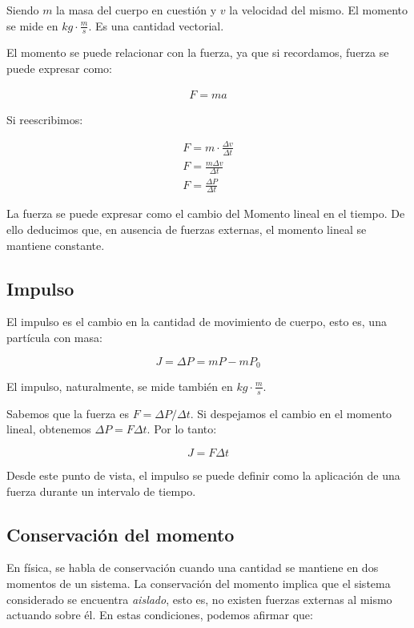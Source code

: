 \documentclass[12pt]{article}
\begin{document}
Siendo \(m\) la masa del cuerpo en cuestión y \(v\) la velocidad del mismo.
El momento se mide en \(kg\cdot\frac{m}{s}\). Es una cantidad vectorial.

El momento se puede relacionar con la fuerza, ya que si recordamos,
fuerza se puede expresar como:

\begin{align*}
	F = ma
\end{align*}

Si reescribimos:

\begin{align*}
	F = m\cdot\frac{\Delta v}{\Delta t} \\
	F = \frac{m \Delta v}{\Delta t}     \\
	F = \frac{\Delta P}{\Delta t}
\end{align*}

La fuerza se puede expresar como el cambio del Momento lineal en el
tiempo.
De ello deducimos que, en ausencia de fuerzas externas,
el momento lineal se mantiene constante.

\subsection{Impulso}


El impulso es el cambio en la cantidad de movimiento de cuerpo,
esto es,
una partícula con masa:

\begin{equation}
	J = \Delta P = mP - mP_{0}
\end{equation}

El impulso, naturalmente, se mide también en \(kg\cdot\frac{m}{s}\).

Sabemos que la fuerza es \(F = \Delta P / \Delta t\).
Si despejamos el cambio en el momento lineal,
obtenemos \(\Delta P = F \Delta t\).
Por lo tanto:

\begin{equation}
	J = F \Delta t
\end{equation}

Desde este punto de vista,
el impulso se puede definir como la aplicación de una fuerza durante un intervalo de tiempo.

\subsection{Conservación del momento}

En física,
se habla de conservación cuando una cantidad se mantiene en dos momentos de un sistema.
La conservación del momento implica que el sistema considerado se encuentra \textit{aislado},
esto es,
no existen fuerzas externas al mismo actuando sobre él.
En estas condiciones, podemos afirmar que:
\end{document}
